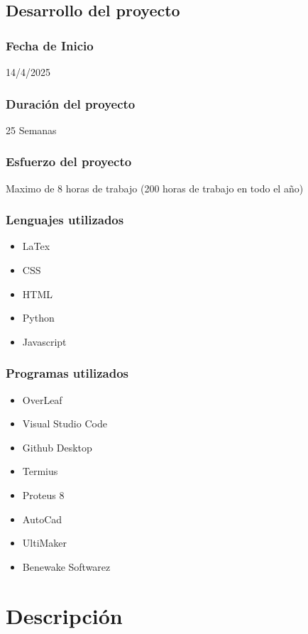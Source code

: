 \documentclass[12pt,a4paper]{article}
\begin{document}
\subsection{Desarrollo del proyecto}
\subsubsection*{Fecha de Inicio}
14/4/2025
\subsubsection*{Duración del proyecto}
25 Semanas
\subsubsection*{Esfuerzo del proyecto}
Maximo de 8 horas de trabajo (200 horas de trabajo en todo el año)
\subsubsection*{Lenguajes utilizados}
\begin{itemize}
\item LaTex
\item CSS
\item HTML
\item Python
\item Javascript
\end{itemize}

\subsubsection*{Programas utilizados}

\begin{itemize}
    \item OverLeaf
    \item Visual Studio Code
    \item Github Desktop
    \item Termius
    \item Proteus 8
    \item AutoCad
    \item UltiMaker
    \item Benewake Softwarez
\end{itemize}

\section{Descripción}
\end{document}
